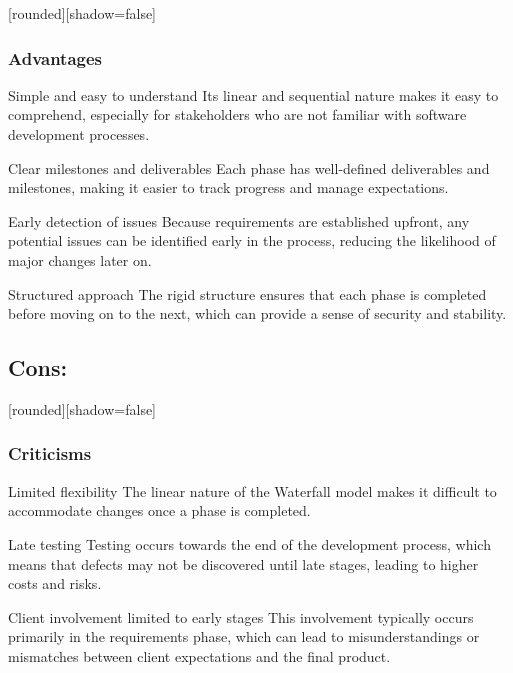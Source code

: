 \documentclass[10pt]{beamer}
\begin{document}
\begin{frame}
[rounded][shadow=false]
\frametitle{Advantages}

\begin{block}{Simple and easy to understand}
Its linear and sequential nature makes it easy to comprehend, especially for stakeholders who are not familiar with software development processes.
\end{block}

\begin{block}{Clear milestones and deliverables}
Each phase has well-defined deliverables and milestones, making it easier to track progress and manage expectations.
\end{block}

\begin{block}{Early detection of issues}
Because requirements are established upfront, any potential issues can be identified early in the process, reducing the likelihood of major changes later on.
\end{block}

\begin{block}{Structured approach}
The rigid structure ensures that each phase is completed before moving on to the next, which can provide a sense of security and stability.
\end{block}

\end{frame}

\subsection{Cons:}

\begin{frame}
[rounded][shadow=false]
\frametitle{Criticisms}

\begin{block}{Limited flexibility}
The linear nature of the Waterfall model makes it difficult to accommodate changes once a phase is completed.
\end{block}

\begin{block}{Late testing}
Testing occurs towards the end of the development process, which means that defects may not be discovered until late stages, leading to higher costs and risks.
\end{block}

\begin{block}{Client involvement limited to early stages}
This involvement typically occurs primarily in the requirements phase, which can lead to misunderstandings or mismatches between client expectations and the final product.
\end{block}

\end{frame}
\end{document}
